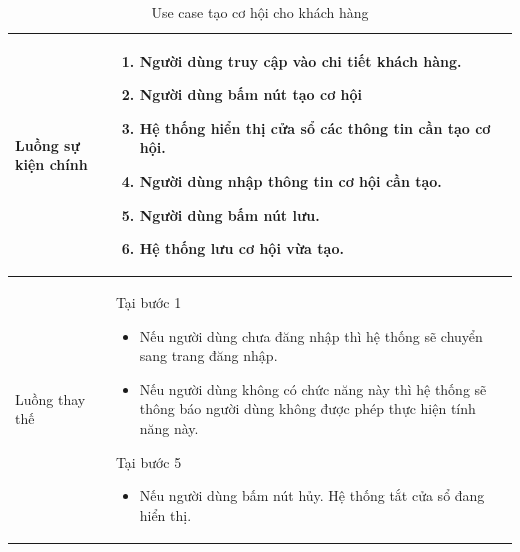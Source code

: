 \documentclass[12pt,a4paper]{article}
\begin{document}
\begin{table}[H]
\begin{tabular}{|p{3.5cm}|p{11.5cm}|c|}
            Luồng sự kiện chính & \vspace{-.8cm}\begin{enumerate}
                                                    \item Người dùng truy cập vào chi tiết khách hàng.
                                                    \item Người dùng bấm nút tạo cơ hội
                                                    \item Hệ thống hiển thị cửa sổ các thông tin cần tạo cơ hội.
                                                    \item Người dùng nhập thông tin cơ hội cần tạo.
                                                    \item Người dùng bấm nút lưu.
                                                    \item Hệ thống lưu cơ hội vừa tạo.
            \end{enumerate}
            \\
            \hline
            Luồng thay thế & Tại bước 1\newline
            \vspace{-.8cm}\begin{itemize}
                              \item Nếu người dùng chưa đăng nhập thì hệ thống sẽ chuyển sang trang đăng nhập.
                              \item Nếu người dùng không có chức năng này thì hệ thống sẽ thông báo người dùng không được phép thực hiện tính năng này.
            \end{itemize}
            Tại bước 5\newline
            \vspace{-.8cm}\begin{itemize}
                              \item Nếu người dùng bấm nút hủy. Hệ thống tắt cửa sổ đang hiển thị.
            \end{itemize}
            \\ \hline
        \end{tabular}
        \caption{Use case tạo cơ hội cho khách hàng}
    \end{table}


\end{document}
